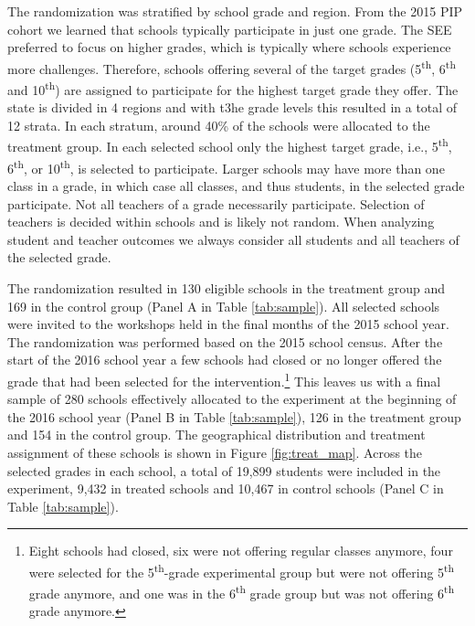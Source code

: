 \documentclass[11pt,a4paper]{article}
\begin{document}
The randomization was stratified by school grade and region. From the 2015 PIP cohort we learned that schools typically participate in just one grade. The SEE preferred to focus on higher grades, which is typically where schools experience more challenges. Therefore, schools offering several of the target grades (5\textsuperscript{th}, 6\textsuperscript{th} and 10\textsuperscript{th}) are assigned to participate for the highest target grade they offer. The state is divided in 4 regions and with t3he  grade levels this resulted in a total of 12 strata. In each stratum, around 40\% of the schools were allocated to the treatment group. In each selected school only the highest target grade, i.e., 5\textsuperscript{th}, 6\textsuperscript{th}, or 10\textsuperscript{th}, is selected to participate. Larger schools may have more than one class in a grade, in which case all classes, and thus students, in the selected grade participate. Not all teachers of a grade necessarily participate. Selection of teachers is decided within schools and is likely not random. When analyzing student and teacher outcomes we always consider all students and all teachers of the selected grade. 

The randomization resulted in 130 eligible schools in the treatment group and 169 in the control group (Panel A in Table \ref{tab:sample}). All selected schools were invited to the workshops held in the final months of the 2015 school year. The randomization was performed based on the 2015 school census. After the start of the 2016 school year a few schools had closed or no longer offered the grade that had been selected for the intervention.\footnote{Eight schools had closed, six were not offering regular classes anymore, four were selected for the 5\textsuperscript{th}-grade experimental group but were not offering 5\textsuperscript{th} grade anymore, and one was in the 6\textsuperscript{th} grade group but was not offering 6\textsuperscript{th} grade anymore.} This leaves us with a final sample of 280 schools effectively allocated to the experiment at the beginning of the 2016 school year (Panel B in Table \ref{tab:sample}), 126 in the treatment group and 154 in the control group. The geographical distribution and treatment assignment of these schools is shown in Figure \ref{fig:treat_map}. Across the selected grades in each school, a total of 19,899 students were included in the experiment, 9,432 in treated schools and 10,467 in control schools (Panel C in Table \ref{tab:sample}).  

\vspace{15pt}
\end{document}
